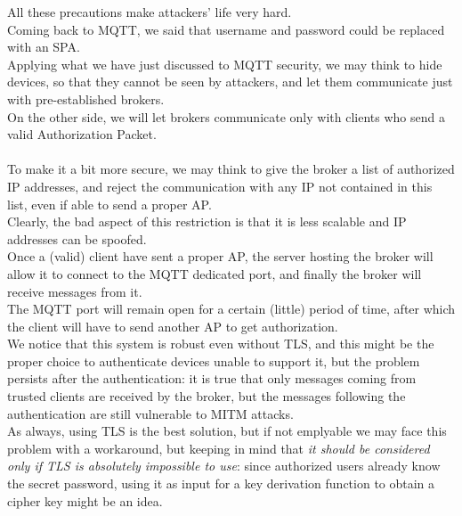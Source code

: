 \documentclass[12pt]{report}
\begin{document}
{All these precautions make attackers' life very hard.\\

Coming back to MQTT, we said that username and password could be replaced with an SPA.\\
Applying what we have just discussed to MQTT security, we may think to hide devices, so that they cannot be seen by attackers, and let them communicate just with pre-established brokers.\\
On the other side, we will let brokers communicate only with clients who send a valid Authorization Packet.\\\\
To make it a bit more secure, we may think to give the broker a list of authorized IP addresses, and reject the communication with any IP not contained in this list, even if able to send a proper AP.\\
Clearly, the bad aspect of this restriction is that it is less scalable and IP addresses can be spoofed.\\

Once a (valid) client have sent a proper AP, the server hosting the broker will allow it to connect to the MQTT dedicated port, and finally the broker will receive messages from it.\\
The MQTT port will remain open for a certain (little) period of time, after which the client will have to send another AP to get authorization.\\

We notice that this system is robust even without TLS, and this might be the proper choice to authenticate devices unable to support it, but the problem persists after the authentication: it is true that only messages coming from trusted clients are received by the broker, but the messages following the authentication are still vulnerable to MITM attacks.\\

As always, using TLS is the best solution, but if not emplyable we may face this problem with a workaround, but keeping in mind that \emph{it should be considered only if TLS is absolutely impossible to use}: since authorized users already know the secret password, using it as input for a key derivation function to obtain a cipher key might be an idea.\\


}
\end{document}
